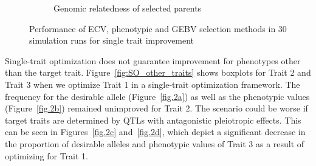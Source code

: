 \documentclass[12pt, a4paper, bibliography=totoc]{scrartcl}
\newcommand{\alert}{\textcolor{red}}
\begin{document}
\begin{figure}[h!t]
\begin{subfigure}[h!t]{\textwidth}
    \caption{Genomic relatedness of selected parents}\label{fig.1c}
    \end{subfigure}
    \caption{Performance of ECV, phenotypic and GEBV selection methods in 30 simulation runs for single trait improvement}
    \label{fig:SO_results}
\end{figure}


Single-trait optimization does not guarantee improvement for phenotypes other than the target trait. Figure~\ref{fig:SO_other_traits} shows boxplots for Trait 2 and Trait 3 when we optimize Trait 1 in a single-trait optimization framework. The frequency for the desirable allele (Figure~\ref{fig.2a}) as well as the phenotypic values (Figure~\ref{fig.2b}) remained unimproved for Trait 2. The scenario could be worse if target traits are determined by QTLs with antagonistic pleiotropic effects. This can be seen in Figures~\ref{fig.2c} and~\ref{fig.2d}, which depict a significant decrease in the proportion of desirable alleles and phenotypic values of Trait 3 as a result of optimizing for Trait 1. 



\end{document}
